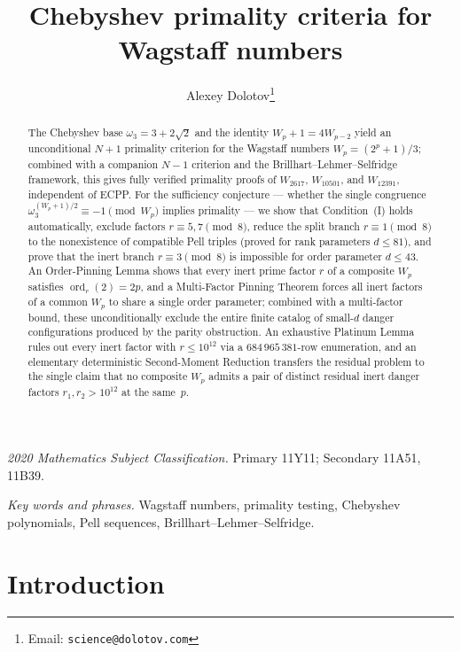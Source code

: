 \documentclass[12pt]{article}
\title{Chebyshev primality criteria for Wagstaff numbers}
\author{Alexey Dolotov\thanks{Email: \texttt{science@dolotov.com}}}
\date{}
\theoremstyle{plain}
\theoremstyle{definition}
\theoremstyle{remark}
\begin{document}
\maketitle

\begin{abstract}
The Chebyshev base \(\omega_3 = 3 + 2\sqrt{2}\) and the identity \(W_p + 1 = 4W_{p-2}\) yield an unconditional \(N+1\) primality criterion for the Wagstaff numbers \(W_p = (2^p + 1)/3\); combined with a companion \(N-1\) criterion and the Brillhart--Lehmer--Selfridge framework, this gives fully verified primality proofs of \(W_{2617}\), \(W_{10501}\), and \(W_{12391}\), independent of ECPP. For the sufficiency conjecture --- whether the single congruence \(\omega_3^{(W_p+1)/2} \equiv -1 \pmod{W_p}\) implies primality --- we show that Condition~(I) holds automatically, exclude factors \(r \equiv 5, 7 \pmod{8}\), reduce the split branch \(r \equiv 1 \pmod{8}\) to the nonexistence of compatible Pell triples (proved for rank parameters \(d \leq 81\)), and prove that the inert branch \(r \equiv 3 \pmod{8}\) is impossible for order parameter \(d \leq 43\). An Order-Pinning Lemma shows that every inert prime factor \(r\) of a composite \(W_p\) satisfies \(\operatorname{ord}_r(2) = 2p\), and a Multi-Factor Pinning Theorem forces all inert factors of a common \(W_p\) to share a single order parameter; combined with a multi-factor bound, these unconditionally exclude the entire finite catalog of small-\(d\) danger configurations produced by the parity obstruction. An exhaustive Platinum Lemma rules out every inert factor with \(r \leq 10^{12}\) via a \(684\,965\,381\)-row enumeration, and an elementary deterministic Second-Moment Reduction transfers the residual problem to the single claim that no composite \(W_p\) admits a pair of distinct residual inert danger factors \(r_1, r_2 > 10^{12}\) at the same~\(p\).

\end{abstract}

\bigskip\noindent
\textit{2020 Mathematics Subject Classification.} Primary 11Y11; Secondary 11A51, 11B39.

\smallskip\noindent
\textit{Key words and phrases.} Wagstaff numbers, primality testing, Chebyshev polynomials, Pell sequences, Brillhart--Lehmer--Selfridge.

\section{Introduction}
\end{document}
